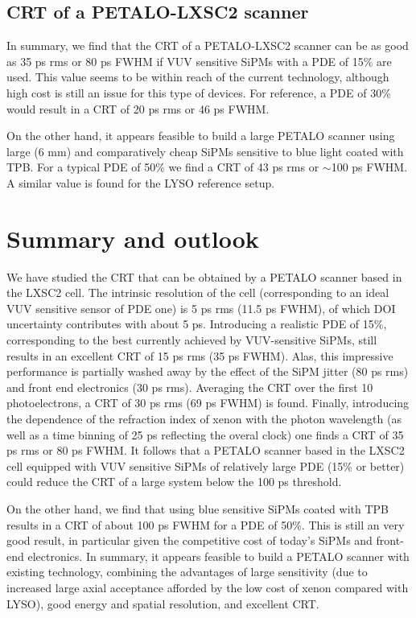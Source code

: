 \documentclass[review]{elsarticle}
\begin{document}
\subsection*{CRT of a PETALO-LXSC2 scanner}
In summary, we find that the CRT of a PETALO-LXSC2 scanner can be as good as 35 ps rms or 80 ps FWHM if VUV sensitive SiPMs with a PDE of 15\% are used. This value seems to be within reach of the current technology, although high cost is still an issue for this type of devices. For reference, a PDE of 30\% would result in a CRT of 20 ps rms or 46 ps FWHM. 

On the other hand, it appears feasible to build a large PETALO scanner using large (6 mm) and comparatively cheap SiPMs sensitive to blue light coated with TPB. For a typical PDE of 50\% we find a CRT of
43 ps rms or $\sim$100 ps FWHM. A similar value is found for the LYSO reference setup.


\section{Summary and outlook}\label{sec.conclu}

We have studied the CRT that can be obtained by a PETALO scanner based in the LXSC2 cell. The intrinsic resolution of the cell (corresponding to an ideal VUV sensitive sensor of PDE one) is 5 ps rms (11.5 ps FWHM), of which DOI uncertainty contributes with about 5 ps. Introducing a realistic PDE of 15\%, corresponding to the best currently achieved by VUV-sensitive SiPMs, still results in an excellent CRT of  15 ps rms (35 ps FWHM). Alas, this impressive performance is partially washed away by the effect of the SiPM jitter (80 ps rms) and front end electronics (30 ps rms). Averaging the CRT over the first 10 photoelectrons, a CRT of 30 ps rms (69 ps FWHM) is found. Finally, introducing the dependence of the 
refraction index of xenon with the photon wavelength (as well as a time binning of 25 ps reflecting the overal clock) one finds a CRT of 35 ps rms or 80 ps FWHM. It follows that a PETALO scanner based in the LXSC2 cell equipped with VUV sensitive SiPMs of relatively large PDE (15\% or better) could reduce the CRT of a large system below the 100 ps threshold. 

On the other hand, we find that using blue sensitive SiPMs coated with TPB results in a CRT of about 100 ps FWHM for a PDE of 50\%. This is still an very good result, in particular given the competitive cost of today's SiPMs and  front-end electronics.  In summary, it appears feasible to build a PETALO scanner with existing technology, combining the advantages of large sensitivity (due to increased large axial acceptance afforded by the low cost of xenon compared with LYSO), good energy and spatial resolution, and excellent CRT.     

\section*{}


\end{document}
